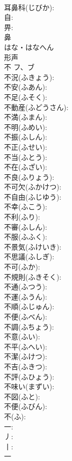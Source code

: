 \documentclass[8pt]{extreport}
\begin{document}
\begin{CJK}{UTF8}{min}
\\	耳鼻科(じびか): 
\\	自: 
\\	畀: 
\\	鼻	
\\	はな・はなへん	
\\	形声 
\\	不	フ、ブ			
\\	不況(ふきょう): 
\\	不安(ふあん): 
\\	不足(ふそく): 
\\	不動産(ふどうさん): 
\\	不満(ふまん): 
\\	不明(ふめい): 
\\	不振(ふしん): 
\\	不正(ふせい): 
\\	不当(ふとう): 
\\	不在(ふざい): 
\\	不良(ふりょう): 
\\	不可欠(ふかけつ): 
\\	不自由(ふじゆう): 
\\	不幸(ふこう): 
\\	不利(ふり): 
\\	不審(ふしん): 
\\	不服(ふふく): 
\\	不景気(ふけいき): 
\\	不思議(ふしぎ): 
\\	不可(ふか): 
\\	不規則(ふきそく): 
\\	不通(ふつう): 
\\	不運(ふうん): 
\\	不順(ふじゅん): 
\\	不便(ふべん): 
\\	不調(ふちょう): 
\\	不意(ふい): 
\\	不平(ふへい): 
\\	不潔(ふけつ): 
\\	不吉(ふきつ): 
\\	不評(ふひょう): 
\\	不味い(まずい): 
\\	不図(ふと): 
\\	不便(ふびん): 
\\	不(ふ): 
\\	一: 
\\	丿: 
\\	丨: 
\\	一	

\end{CJK}
\end{document}

